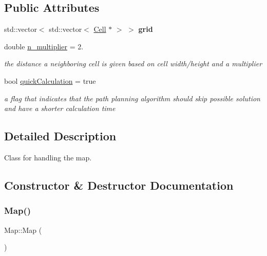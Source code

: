 \subsection*{Public Attributes}
\begin{DoxyCompactItemize}
\item 
\mbox{\label{class_map_a550c4a27e88ecaed45b6fe075c647751}} 
std\+::vector$<$ std\+::vector$<$ \mbox{\hyperlink{class_cell}{Cell}} $\ast$ $>$ $>$ {\bfseries grid}
\item 
\mbox{\label{class_map_acb457d584b56b2f61a2f191f60c1c15c}} 
double \mbox{\hyperlink{class_map_acb457d584b56b2f61a2f191f60c1c15c}{n\+\_\+multiplier}} = 2.
\begin{DoxyCompactList}\small\item\em the distance a neighboring cell is given based on cell width/height and a multiplier \end{DoxyCompactList}\item 
\mbox{\label{class_map_ad766d9e026f8085e6b113d8274b2b109}} 
bool \mbox{\hyperlink{class_map_ad766d9e026f8085e6b113d8274b2b109}{quick\+Calculation}} = true
\begin{DoxyCompactList}\small\item\em a flag that indicates that the path planning algorithm should skip possible solution and have a shorter calculation time \end{DoxyCompactList}\end{DoxyCompactItemize}


\subsection{Detailed Description}
Class for handling the map. 

\subsection{Constructor \& Destructor Documentation}
\mbox{\label{class_map_a0f5ad0fd4563497b4214038cbca8b582}} 
\subsubsection{\texorpdfstring{Map()}{Map()}}
{\footnotesize\ttfamily Map\+::\+Map (\begin{DoxyParamCaption}{ }\end{DoxyParamCaption})}

